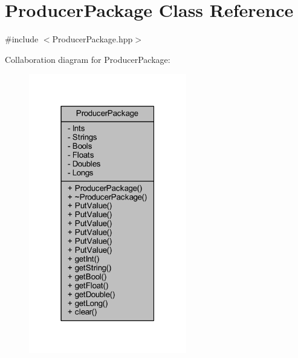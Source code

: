\hypertarget{class_producer_package}{\section{Producer\-Package Class Reference}
\label{class_producer_package}
}


{\ttfamily \#include $<$Producer\-Package.\-hpp$>$}



Collaboration diagram for Producer\-Package\-:\nopagebreak
\begin{figure}[H]
\begin{center}
\leavevmode
\includegraphics[width=195pt]{class_producer_package__coll__graph}
\end{center}
\end{figure}
